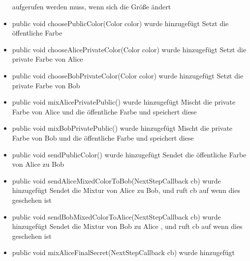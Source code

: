 \documentclass{article}
\begin{document}
\begin{itemize}
               aufgerufen werden muss, wenn sich die Größe ändert\newline
           \item public void choosePublicColor(Color color) wurde hinzugefügt\newline
               Setzt die öffentliche Farbe\newline
           \item public void chooseAlicePrivateColor(Color color) wurde hinzugefügt\newline
               Setzt die private Farbe von Alice\newline
           \item public void chooseBobPrivateColor(Color color) wurde hinzugefügt\newline
               Setzt die private Farbe von Bob\newline
           \item public void mixAlicePrivatePublic() wurde hinzugefügt\newline
               Mischt die private Farbe von Alice und die öffentliche Farbe\newline
               und speichert diese\newline
           \item public void mixBobPrivatePublic() wurde hinzugefügt\newline
               Mischt die private Farbe von Bob und die öffentliche Farbe\newline
               und speichert diese\newline
           \item public void sendPublicColor() wurde hinzugefügt\newline
               Sendet die öffentliche Farbe von Alice zu Bob\newline
           \item public void sendAliceMixedColorToBob(NextStepCallback cb) wurde hinzugefügt\newline
               Sendet die Mixtur von Alice zu Bob, und ruft cb auf wenn dies geschehen ist\newline
           \item public void sendBobMixedColorToAlice(NextStepCallback cb) wurde hinzugefügt\newline
               Sendet die Mixtur von Bob zu Alice , und ruft cb auf wenn dies geschehen ist\newline
           \item public void mixAliceFinalSecret(NextStepCallback cb) wurde hinzugefügt\newline

\end{itemize}
\end{document}
